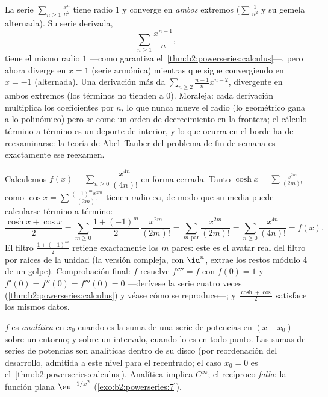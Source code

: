 \begin{example}\label{ex:b2:powerseries:boundaryloss}
La serie $\sum_{n\geq1}\frac{x^n}{n^2}$ tiene radio $1$ y converge
en \emph{ambos} extremos ($\sum\frac1{n^2}$ y su gemela alternada).
Su serie derivada,
\[
\sum_{n\geq1}\frac{x^{n-1}}{n} ,
\]
tiene el mismo radio $1$ ---como garantiza el~\cref{thm:b2:powerseries:calculus}---, pero ahora diverge en $x = 1$
(serie armónica) mientras que sigue convergiendo en $x = -1$
(alternada). Una derivación más da $\sum_{n\geq2}\frac{n-1}{n}
x^{n-2}$, divergente en ambos extremos (los términos no tienden a
$0$). Moraleja: cada derivación multiplica los coeficientes por $n$,
lo que nunca mueve el radio (lo geométrico gana a lo polinómico)
pero se come un orden de decrecimiento en la frontera; el cálculo
término a término es un deporte de interior, y lo que ocurra en el
borde ha de reexaminarse: la teoría de Abel--Tauber del problema de
fin de semana es exactamente ese reexamen.
\end{example}

\begin{example}\label{ex:b2:powerseries:quarter}
Calculemos $f(x) = \sum_{n\geq0} \dfrac{x^{4n}}{(4n)!}$ en forma
cerrada. Tanto $\cosh x = \sum \frac{x^{2m}}{(2m)!}$ como $\cos x =
\sum \frac{(-1)^m x^{2m}}{(2m)!}$ tienen radio $\infty$, de modo que
su media puede calcularse término a término:
\[
\frac{\cosh x + \cos x}{2}
= \sum_{m\geq0}\frac{1 + (-1)^m}{2}\,\frac{x^{2m}}{(2m)!}
= \sum_{m \text{ par}}\frac{x^{2m}}{(2m)!}
= \sum_{n\geq0}\frac{x^{4n}}{(4n)!} = f(x) .
\]
El filtro $\frac{1+(-1)^m}{2}$ retiene exactamente los $m$ pares:
este es el avatar real del filtro por raíces de la unidad (la
versión compleja, con $\iu^n$, extrae los restos módulo $4$ de un
golpe). Comprobación final: $f$ resuelve $f'''' = f$ con $f(0) = 1$
y $f'(0) = f''(0) = f'''(0) = 0$ ---derívese la serie cuatro veces
(\cref{thm:b2:powerseries:calculus}) y véase cómo se reproduce---; y
$\frac{\cosh + \cos}{2}$ satisface los mismos datos.
\end{example}

\begin{definition}\label{def:b2:powerseries:analytic}
$f$ es \emph{analítica} en $x_0$ cuando es
la suma de una serie de potencias en $(x - x_0)$ sobre un entorno; y
sobre un intervalo, cuando lo es en todo punto. Las sumas de series
de potencias son analíticas dentro de su disco (por reordenación del
desarrollo, admitida a este nivel para el recentrado; el caso $x_0 =
0$ es el~\cref{thm:b2:powerseries:calculus}). Analítica implica
$C^\infty$; el recíproco \emph{falla}: la función plana
$\eu^{-1/x^2}$ (\cref{exo:b2:powerseries:7}).
\end{definition}

